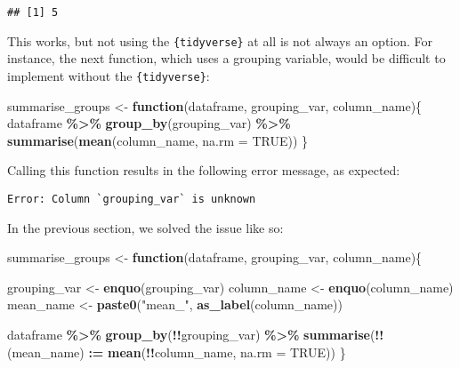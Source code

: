 \documentclass[
]{article}
\newenvironment{Shaded}{\begin{snugshade}}{\end{snugshade}}
\newcommand{\ControlFlowTok}[1]{\textcolor[rgb]{0.13,0.29,0.53}{\textbf{#1}}}
\newcommand{\DataTypeTok}[1]{\textcolor[rgb]{0.13,0.29,0.53}{#1}}
\newcommand{\ErrorTok}[1]{\textcolor[rgb]{0.64,0.00,0.00}{\textbf{#1}}}
\newcommand{\KeywordTok}[1]{\textcolor[rgb]{0.13,0.29,0.53}{\textbf{#1}}}
\newcommand{\NormalTok}[1]{#1}
\newcommand{\OperatorTok}[1]{\textcolor[rgb]{0.81,0.36,0.00}{\textbf{#1}}}
\newcommand{\OtherTok}[1]{\textcolor[rgb]{0.56,0.35,0.01}{#1}}
\newcommand{\StringTok}[1]{\textcolor[rgb]{0.31,0.60,0.02}{#1}}
\begin{document}
\begin{verbatim}
## [1] 5
\end{verbatim}

This works, but not using the \texttt{\{tidyverse\}} at all is not always an option. For instance,
the next function, which uses a grouping variable, would be difficult to implement without the
\texttt{\{tidyverse\}}:

\begin{Shaded}
\begin{Highlighting}[]
\NormalTok{summarise\_groups \textless{}{-}}\StringTok{ }\ControlFlowTok{function}\NormalTok{(dataframe, grouping\_var, column\_name)\{}
\NormalTok{  dataframe }\OperatorTok{\%\textgreater{}\%}
\StringTok{    }\KeywordTok{group\_by}\NormalTok{(grouping\_var) }\OperatorTok{\%\textgreater{}\%}\StringTok{  }
\StringTok{    }\KeywordTok{summarise}\NormalTok{(}\KeywordTok{mean}\NormalTok{(column\_name, }\DataTypeTok{na.rm =} \OtherTok{TRUE}\NormalTok{))}
\NormalTok{\}}
\end{Highlighting}
\end{Shaded}

Calling this function results in the following error message, as expected:

\begin{verbatim}
Error: Column `grouping_var` is unknown
\end{verbatim}

In the previous section, we solved the issue like so:

\begin{Shaded}
\begin{Highlighting}[]
\NormalTok{summarise\_groups \textless{}{-}}\StringTok{ }\ControlFlowTok{function}\NormalTok{(dataframe, grouping\_var, column\_name)\{}

\NormalTok{  grouping\_var \textless{}{-}}\StringTok{ }\KeywordTok{enquo}\NormalTok{(grouping\_var)}
\NormalTok{  column\_name \textless{}{-}}\StringTok{ }\KeywordTok{enquo}\NormalTok{(column\_name)}
\NormalTok{  mean\_name \textless{}{-}}\StringTok{ }\KeywordTok{paste0}\NormalTok{(}\StringTok{"mean\_"}\NormalTok{, }\KeywordTok{as\_label}\NormalTok{(column\_name))}

\NormalTok{  dataframe }\OperatorTok{\%\textgreater{}\%}
\StringTok{    }\KeywordTok{group\_by}\NormalTok{(}\OperatorTok{!!}\NormalTok{grouping\_var) }\OperatorTok{\%\textgreater{}\%}\StringTok{  }
\StringTok{    }\KeywordTok{summarise}\NormalTok{(}\OperatorTok{!!}\NormalTok{(mean\_name) }\OperatorTok{:}\ErrorTok{=}\StringTok{ }\KeywordTok{mean}\NormalTok{(}\OperatorTok{!!}\NormalTok{column\_name, }\DataTypeTok{na.rm =} \OtherTok{TRUE}\NormalTok{))}
\NormalTok{\}}
\end{Highlighting}
\end{Shaded}
\end{document}
